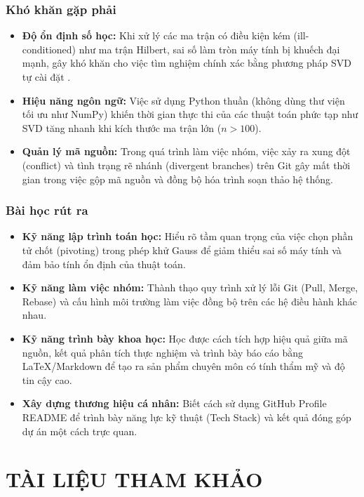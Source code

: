 \documentclass[12pt]{article}
\begin{document}
\subsubsection{Khó khăn gặp phải}
\begin{itemize}
    \item \textbf{Độ ổn định số học:} Khi xử lý các ma trận có điều kiện kém (ill-conditioned) như ma trận Hilbert, sai số làm tròn máy tính bị khuếch đại mạnh, gây khó khăn cho việc tìm nghiệm chính xác bằng phương pháp SVD tự cài đặt .
    \item \textbf{Hiệu năng ngôn ngữ:} Việc sử dụng Python thuần (không dùng thư viện tối ưu như NumPy) khiến thời gian thực thi của các thuật toán phức tạp như SVD tăng nhanh khi kích thước ma trận lớn ($n > 100$).
    \item \textbf{Quản lý mã nguồn:} Trong quá trình làm việc nhóm, việc xảy ra xung đột (conflict) và tình trạng rẽ nhánh (divergent branches) trên Git gây mất thời gian trong việc gộp mã nguồn và đồng bộ hóa trình soạn thảo hệ thống.
\end{itemize}

\subsubsection{Bài học rút ra}
\begin{itemize}
    \item \textbf{Kỹ năng lập trình toán học:} Hiểu rõ tầm quan trọng của việc chọn phần tử chốt (pivoting) trong phép khử Gauss để giảm thiểu sai số máy tính và đảm bảo tính ổn định của thuật toán.
    \item \textbf{Kỹ năng làm việc nhóm:} Thành thạo quy trình xử lý lỗi Git (Pull, Merge, Rebase) và cấu hình môi trường làm việc đồng bộ trên các hệ điều hành khác nhau.
    \item \textbf{Kỹ năng trình bày khoa học:} Học được cách tích hợp hiệu quả giữa mã nguồn, kết quả phân tích thực nghiệm và trình bày báo cáo bằng \LaTeX{}/Markdown để tạo ra sản phẩm chuyên môn có tính thẩm mỹ và độ tin cậy cao.
    \item \textbf{Xây dựng thương hiệu cá nhân:} Biết cách sử dụng GitHub Profile README để trình bày năng lực kỹ thuật (Tech Stack) và kết quả đóng góp dự án một cách trực quan.
\end{itemize}

\newpage
\section{TÀI LIỆU THAM KHẢO}
\end{document}
